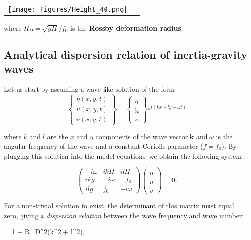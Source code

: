 \begin{center}
	\begin{tabular}{cc}
		\texttt{[image: Figures/Height\_40.png]}
	\end{tabular}
\end{center}

where $R_D = \sqrt{gH}/f_0$ is the {\bf Rossby deformation radius}.


\subsection{Analytical dispersion relation of inertia-gravity waves}

Let us start by assuming a wave like solution of the form
\begin{equation}
	\left \{ \begin{array}{c} \eta(x,y,t) \\ u(x,y,t) \\ v(x,y,t) \end{array} \right \} 
	= 
	\left \{ \begin{array}{c} \tilde{\eta} \\ \tilde{u} \\ \tilde{v} \end{array} \right \} e^{i (kx+ly-\omega t)}
\end{equation}

where $k$ and $l$ are the $x$ and $y$ components of the wave vector $\mathbf{k}$ and $\omega$ is the angular frequency of the wave and a constant Coriolis parameter ($f = f_0$). By plugging this solution into the model equations, we obtain the following system :

\[
\left( \begin{array}{ccc}
	-i \omega & ikH & ilH \\
	ikg & -i \omega & -f_0 \\
	ilg & f_0 & -i \omega 
\end{array} \right )
\left( \begin{array}{c} \tilde{\eta} \\ \tilde{u} \\ \tilde{v} \end{array} \right )
= 
\mathbf{0}.
\]

For a non-trivial solution to exist, the determinant of this matrix
must equal zero, giving a {\em dispersion relation} between the wave
frequency and wave number: 

\BEQ 
\label{disp_exact}
 = 1 + R_D^2(k^2 + l^2), 
\EEQ 

